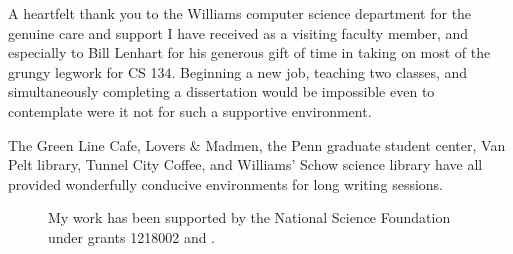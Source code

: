A heartfelt thank you to the Williams computer science department for
the genuine care and support I have received as a visiting faculty
member, and especially to Bill Lenhart for his generous gift of time
in taking on most of the grungy legwork for CS 134.  Beginning a new
job, teaching two classes, and simultaneously completing a
dissertation would be impossible even to contemplate were it not for
such a supportive environment.

The Green Line Cafe, Lovers \& Madmen, the Penn graduate student
center, Van Pelt library, Tunnel City Coffee, and Williams' Schow
science library have all provided wonderfully conducive environments
for long writing sessions.


\begin{figure}[b]
\tiny\flushleft

My work has been supported by the National Science Foundation under
grants 1218002  and .
\end{figure}
